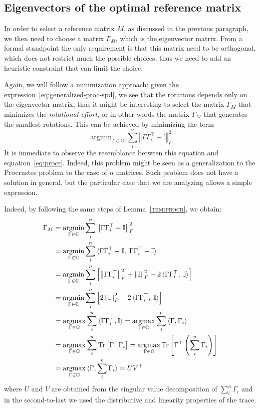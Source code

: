 \documentclass[fleqn]{article}
\theoremstyle{theorem}
\theoremstyle{definition}
\newcommand{\lemmaref}[1]{Lemma~\textsc{\ref{#1}}}
\DeclareMathOperator*{\argmin}{argmin}
\DeclareMathOperator*{\argmax}{argmax}
\DeclareMathOperator{\tr}{Tr}
\newcommand{\norm}[2][]{\left\Vert#2\right\Vert_{#1}}
\begin{document}
    \subsection{Eigenvectors of the optimal reference matrix}
    In order to select a reference matrix $M$, as discussed in the previous paragraph, we then need to choose a matrix $\Gamma_M$, which is the eigenvector matrix. From a formal standpoint the only requirement is that this matrix need to be orthogonal, which does not restrict much the possible choices, thus we need to add an heuristic constraint that can limit the choice.

    Again, we will follow a minimization approach: given the expression~\eqref{eq:generalized-proc-spd}, we see that the rotations depends only on the eigenvector matrix, thus it might be interesting to select the matrix $\Gamma_M$ that minimizes the \emph{rotational effort}, or in other words the matrix $\Gamma_M$ that generates the smallest rotations. This can be achieved by minimizing the term
    \begin{equation}
        \argmin_{\Gamma\in\mathbb{O}} \sum_i^n\norm[F]{\Gamma\Gamma_i^\top - \mathbb{I}}^2
    \end{equation}
    It is immediate to observe the resemblance between this equation and equation~\eqref{eq:procr}. Indeed, this problem might be seen as a generalization to the Procrustes problem to the case of $n$ matrices. Such problem does not have a solution in general, but the particular case that we are analyzing allows a simple expression.

    Indeed, by following the same steps of \lemmaref{thm:procr}, we obtain:
    \begin{align}
        \nonumber\Gamma_M 	&= \argmin_{\Gamma\in\mathbb{O}}\sum_i^n\norm[F]{\Gamma \Gamma_i^\top - \mathbb{I}}^2\\
        \nonumber&= \argmin_{\Gamma\in\mathbb{O}}\sum_i^n\braket{\Gamma\Gamma_i^\top - \mathbb{I},\; \Gamma\Gamma_i^\top - \mathbb{I}}\\
        \nonumber&= \argmin_{\Gamma\in\mathbb{O}}\sum_i^n\left[\norm[F]{\Gamma \Gamma_i^\top}^2 + \norm[F]{\mathbb{I}}^2 - 2\braket{\Gamma\Gamma_i^\top,\; \mathbb{I}}\right]\\
        \nonumber&= \argmin_{\Gamma\in\mathbb{O}}\sum_i^n\left[2\norm[F]{\mathbb{I}}^2 - 2\braket{\Gamma\Gamma_i^\top,\; \mathbb{I}}\right]\\
        \nonumber&= \argmax_{\Gamma\in\mathbb{O}}\sum_i^n\braket{\Gamma\Gamma_i^\top,\mathbb{I}} = \argmax_{\Gamma\in\mathbb{O}} \sum_i^n \braket{\Gamma,\Gamma_i}\\
        \nonumber&= \argmax_{\Gamma\in\mathbb{O}} \sum_i^n \tr\left[\Gamma^\top\Gamma_i\right] = \argmax_{\Gamma\in\mathbb{O}} \tr\left[\Gamma^\top\left(\sum_i^n \Gamma_i\right)\right]\\
        &= \argmax_{\Gamma\in\mathbb{O}}\braket{\Gamma, \sum_i^n\Gamma_i} = UV^\top \label{eq:optiref-sol-eigvec}
    \end{align}
    where $U$ and $V$ are obtained from the singular value decomposition of $\sum_i^n\Gamma_i$ and in the second-to-last we used the distributive and linearity properties of the trace.



    \newpage\printbibliography
\end{document}
